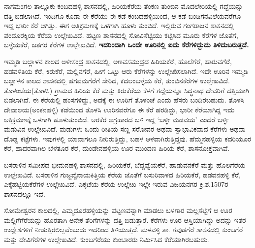 \vskip 2pt

ನಾಗಮಂಗಲ ತಾಲ್ಲೂಕು ಕಂಬದಹಳ್ಳಿ ಶಾಸನದಲ್ಲಿ, ಹಿರಿಯಕೆರೆಯ ತೆಂಕಣ ತುಂಬಿನ ಮೊದಲೇರಿಯಲ್ಲಿ ಗದ್ದೆಯನ್ನು ದತ್ತಿ ಬಿಡಲಾಗಿದೆ. ಇಂದಿಗೂ ಕೂಡಾ ಈ ಕೆರೆಯು ಈ ಕಡೆ ಕಂಬದಹಳ್ಳಿಯಿಂದ, ಆ ಕಡೆ ಬಿಂಡಿಗನವಿಲೆಯವರೆಗೂ ಇದ್ದ ಭಾರೀ ಕೆರೆ ಆಗಿತ್ತು. ಈಗ ಅತಿಕ್ರಮಣಕ್ಕೆ ಒಳಗಾಗಿ ಹೂಳು ತುಂಬಿದೆ. ಇಲ್ಲಿರುವ ಗಂಗರಾಜನ ಶಾಸನದಲ್ಲಿ ಪಂದೂರಕ್ಕಿಯ ಕೆರೆಯ ಉಲ್ಲೇಖವಿದೆ. ಹಟ್ಟಣ ಶಾಸನದಲ್ಲಿ ಸೋವಿಸೆಟ್ಟಿಯು ಕಟ್ಟಿಸಿದ ಮೂರು ಕೆರೆಗಳ ಜೊತೆಗೆ, ಬಳ್ಳೆಯಕೆರೆ, ಜತಗರ ಕೆರೆಗಳ ಉಲ್ಲೇಖವಿದೆ. \textbf{ಇದರಿಂದಾಗಿ ಒಂದೇ ಊರಿನಲ್ಲಿ ಐದು ಕೆರೆಗಳಿದ್ದುದು ತಿಳಿದುಬರುತ್ತದೆ.}

\vskip 2pt

ಇಮ್ಮಡಿ ಬಲ್ಲಾಳನ ಕಾಲದ ಅಳೀಸಂದ್ರ ಶಾಸನದಲ್ಲಿ, ಅಣವಸಮುದ್ರದ ಹಿರಿಯಕೆರೆ, ಹೊಲೆಗೆರೆ, ಹಾರುವಗೆರೆ, ಹಡವಳಿತಿಯ ಕೆರೆ, ಕಿರುಕೆರೆ, ಮಲ್ಲಿನಗೆರೆ, ಹೀಗೆ ಒಟ್ಟು ಆರು ಕೆರೆಗಳನ್ನು ಉಲ್ಲೇಖಿಸಲಾಗಿದೆ. ಇದೇ ಊರಿನ ಇಮ್ಮಡಿ ಬಲ್ಲಾಳನ ಕಾಲದ ಶಾಸನದಲ್ಲಿ ಹಗವಮಗೆರೆಗೆ ಸೇರಿದ, ಕದಲಂಬಳ್ಳೆಯ ಕೆರೆ, ತುಂಬಿನಕೆರೆಗಳ ಉಲ್ಲೇಖವಿದೆ. ತೊಳಂಚೆಯ(ತೊಳಸಿ) ಗ್ರಾಮದ ಹಿರಿಯ ಕೆರೆ ಮತ್ತು ಕಿರುಕೆರೆಯ ಕೆಳಗೆ ಗದ್ದೆಯನ್ನೂ ಸಿದ್ಧನಾಥ ದೇವರಿಗೆ ದತ್ತಿಯಾಗಿ ಬಿಡಲಾಗಿದೆ. ಈ ಕೆರೆಯಲ್ಲಿ ಹಂಸಗಳಿದ್ದು, ಅದಕ್ಕೆ ಈ ಊರಿಗೆ ತೊಳಂಚೆ ಎಂದು ಹೆಸರು ಬಂದಿರಬಹುದು. ತೊಳಸಿ ದೇವಾಲಯ(ಅಂಕನಹಳ್ಳಿ) ಕಡೆಯಿಂದ ತೊಳಸಿ ಊರಿನವರೆಗೂ ಈ ಕೆರೆ ಹರಡಿದ್ದು, ಭಾರೀ ಕೆರೆಯಾಗಿದ್ದ ಇದು ಅತಿಕ್ರಮಣಕ್ಕೆ ಒಳಗಾಗಿ ಹೂಳುತುಂಬಿದೆ. ಅರಕೆರ ಅಗ್ರಹಾರದ ಬಳಿ ಇದ್ದ ‘ಬಳ್ಳೀ ಮಡವಯ’ ಎಂದರೆ ಬಳ್ಳೀ ಮಡುವಿನ ಉಲ್ಲೇಖವಿದೆ. ಮಡುಗಳು ಒಂದು ರೀತಿಯ ಸಣ್ಣ ಸರೋವರ ಅಥವಾ ಸ್ವಾಭಾವಿಕವಾದ ಕೆರೆಗಳು ಅಥವಾ ದೊಡ್ಡ ಕಟ್ಟೆಗಳು. ಇವುಗಳಲ್ಲಿ ಯಾವಾಗಲೂ ನೀರಿರುತ್ತಿದ್ದು, ಬಹಳ ಆಳವಾಗಿರುತ್ತಿದ್ದವು. ಹೆಮ್ಮನಹಳ್ಳಿಯ ಕದರಿಯೂರ ಕೆರೆ, ಹಾದರವಾಗಿಲ ಬೆಳತೂರ ಕೆರೆ, ದುಂಡೇನಹಳ್ಳಿಯ ಊರ ಮುಂದಣ ಹಿರಿಯ ಕೆರೆ, ಶಾಸನೋಕ್ತವಾಗಿವೆ.

\vskip 2pt

ಬಸರಾಳಿನ ಸಮೀಪದ ಭೀಮನಹಳ್ಳಿ ಶಾಸನದಲ್ಲಿ, ಹಿರಿಯಕೆರೆ, ಬೆದ್ದವ್ವೆಯಕೆರೆ, ಹಾಡುವನಕೆರೆ ಮತ್ತು ಹೊಲಗೆರೆಯ ಉಲ್ಲೇಖವಿದೆ. ಬಸರಾಳಿನ ಗುಜ್ಜವ್ವೆನಾಯಕಿತ್ತಿಯ ಕೆರೆಯ ಜೊತೆಗೆ ಬಸುರಿವಾಳದ ಹಿರಿಯಕೆರೆ, ಹಡವನಹಳ್ಳಿ ಕೆರೆ, ಎಕ್ಕೆಹಟ್ಟಿಯಕೆರೆಗಳ ಉಲ್ಲೇಖವಿದೆ. ಎಕ್ಕಟೆಯ ಕೆರೆಯ ಉಲ್ಲೇಖ ಇಲ್ಲೇ ಇರುವ ವಿಜಯನಗರ ಕ್ರಿ.ಶ.1507ರ ಶಾಸನದಲ್ಲೂ ಇದೆ.

\vskip 2pt

ಸೋಮೇಶ್ವರನ ಕಾಲದಲ್ಲಿ, ಎಮ್ಮದೂರಹಳ್ಳಿಯನ್ನು ಪಟ್ಟಣವನ್ನಾಗಿ ಮಾಡಲು ಬಳಗಾರ ಮಲ್ಲಸೆಟ್ಟಿಗೆ ಆ ಊರ ಮಲ್ಲಿಗೆಗೆರೆಯನ್ನು ಹೊರತಾಗಿ ಅನೇಕ ತೆರಿಗೆಗಳನ್ನು ದತ್ತಿ ಬಿಡುತ್ತಾರೆ. ಕೆರೆಗಳು ಊರ ಆಸ್ತಿಯಾಗಿದ್ದು ಅದನ್ನು ಇತರ ಉದ್ದೇಶಗಳಿಗೆ ನೀಡುತ್ತಿರಲಿಲ್ಲವೆಂಬುದು ಇದರಿಂದ ತಿಳಿಯುತ್ತದೆ. ಮಳವಳ್ಳಿ ತಾ. ಗವುಡಗೆರೆ ಶಾಸನದಲ್ಲಿ ಕುಂಬಗೆರೆ ಮತ್ತು ದೇವಿಗೆರೆಗಳ ಉಲ್ಲೇಖವಿದೆ. ಕುಂಬಗೆರೆಯು ಕುಂಬಾರರು ನಿರ್ಮಿಸಿದ ಕೆರೆಯಾಗಿರಬಹುದು.

